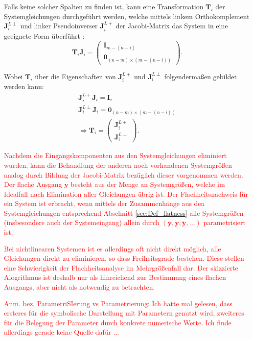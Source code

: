 Falls keine solcher Spalten zu finden ist, kann eine Transformation $\mathbf{T}_i$ der Systemgleichungen durchgeführt werden, welche mittels linkem Orthokomplement $\mathbf{J}_i^{L \perp}$ und linker Pseudoinverser $\mathbf{J}_i^{L +}$ der Jacobi-Matrix das System in eine geeignete Form überführt \cite[Abschnitt 2.1.2]{Fritzsche2016}:
\begin{equation}
	\mathbf{T}_i \mathbf{J}_i = 
	\begin{pmatrix}
		\mathbf{I}_{m-(n-i)} \\
		\mathbf{0}_{(n-m) \times (m-(n-i))}
	\end{pmatrix}.
\end{equation}

Wobei $\mathbf{T}_i$ über die Eigenschaften von $\mathbf{J}_i^{L +}$ und  $\mathbf{J}_i^{L \perp}$ folgendermaßen gebildet werden kann:
\begin{align}
	\mathbf{J}_i^{L +} \mathbf{J}_i = \mathbf{I}_i \\
	\mathbf{J}_i^{L \perp} \mathbf{J}_i = \mathbf{0}_{(n-m) \times (m-(n-i))} \\
	\Rightarrow \mathbf{T}_i = 
	\begin{pmatrix}
		\mathbf{J}_i^{L +} \\
		\mathbf{J}_i^{L \perp}
	\end{pmatrix} .
\end{align}

\textcolor{red}{Nachdem die Eingangskomponenten aus den Systemgleichungen eliminiert wurden, kann die Behandlung der anderen noch vorhandenen Systemgrößen analog durch Bildung der Jacobi-Matrix bezüglich dieser vorgenommen werden. Der  flache Ausgang $\mathbf{y}$ besteht aus der Menge an Systemgrößen, welche im Idealfall nach Elimination aller Gleichungen übrig ist. Der Flachheitsnachweis für ein System ist erbracht, wenn mittels der Zusammenhänge aus den Systemgleichungen entsprechend Abschnitt \ref{sec:Def_flatness} alle Systemgrößen (insbesondere auch der Systemeingang) allein durch $(\mathbf{y}, \dot{\mathbf{y}}, \ddot{\mathbf{y}}, ...)$ parametrisiert ist.}

\textcolor{red}{Bei nichtlinearen Systemen ist es allerdings oft nicht direkt möglich, alle Gleichungen direkt zu eliminieren, so dass Freiheitsgrade bestehen. Diese stellen eine Schwierigkeit der Flachheitsanalyse im Mehrgrößenfall dar. Der skizzierte Alogrithmus ist deshalb nur als hinreichend zur Bestimmung eines flachen Ausgangs, aber nicht als notwendig zu betrachten.}

\textcolor{red}{Anm. bez. ParametriSIerung vs Parametrierung: Ich hatte mal gelesen, dass ersteres für die symbolische Darstellung mit Parametern genutzt wird, zweiteres für die Belegung der Parameter durch konkrete numerische Werte. Ich finde allerdings gerade keine Quelle dafür ...}


